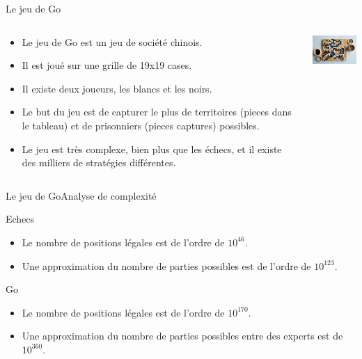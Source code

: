 \begin{frame}{Le jeu de Go}
    \begin{block}{}
        \begin{columns}
            \begin{column}{8cm}
                \begin{itemize}
                    \item Le jeu de Go est un jeu de société chinois.
                    \item Il est joué sur une grille de 19x19 cases.
                    \item Il existe deux joueurs, les blancs et les noirs.
                    \item Le but du jeu est de capturer le plus de territoires (pieces dans le tableau) et de prisonniers (pieces captures) possibles.
                    \item Le jeu est très complexe, bien plus que les échecs, et il existe des milliers de stratégies différentes.
                \end{itemize}
            \end{column}
            \begin{column}{3cm}
                \includegraphics[width=3cm]{ressources/Go_tableau}
            \end{column}
        \end{columns}
    \end{block}
\end{frame}


\begin{frame}{Le jeu de Go}{Analyse de complexité}
    \begin{block}{Echecs}
        \begin{itemize}
            \item Le nombre de positions légales est de l'ordre de $10^{46}$.
            \item Une approximation du nombre de parties possibles est de l'ordre de $10^{123}$.
        \end{itemize}
    \end{block}
    \begin{alertblock}{Go}
        \begin{itemize}
            \item Le nombre de positions légales est de l'ordre de $10^{170}$.
            \item Une approximation du nombre de parties possibles entre des experts est de $10^{360}$.
        \end{itemize}
    \end{alertblock}
\end{frame}

